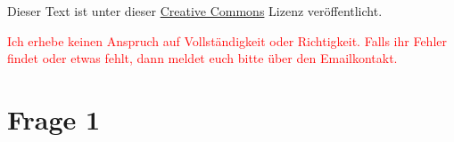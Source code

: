 




\maketitle

Dieser Text ist unter dieser \href{http://creativecommons.org/licenses/by-nc-sa/4.0/}{Creative Commons} Lizenz veröffentlicht.

\textcolor{red}{Ich erhebe keinen Anspruch auf Vollständigkeit oder Richtigkeit. Falls ihr Fehler findet oder etwas fehlt, dann meldet euch bitte über den Emailkontakt.}

\tableofcontents


\newpage

\section{Frage 1}



